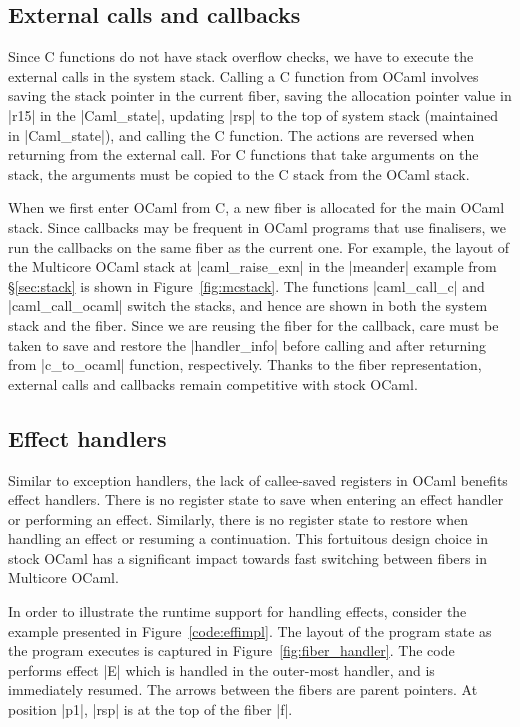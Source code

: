 \documentclass[sigplan,screen]{acmart}
\begin{document}
\subsection{External calls and callbacks}

Since C functions do not have stack overflow checks, we have to execute the
external calls in the system stack. Calling a C function from OCaml involves
saving the stack pointer in the current fiber, saving the allocation pointer
value in |r15| in the |Caml_state|, updating |rsp| to the top of system stack
(maintained in |Caml_state|), and calling the C function. The actions are
reversed when returning from the external call. For C functions that take
arguments on the stack, the arguments must be copied to the C stack from the
OCaml stack.

When we first enter OCaml from C, a new fiber is allocated for the main OCaml
stack. Since callbacks may be frequent in OCaml programs that use finalisers,
we run the callbacks on the same fiber as the current one. For example, the
layout of the Multicore OCaml stack at |caml_raise_exn| in the |meander|
example from \S\ref{sec:stack} is shown in Figure~\ref{fig:mcstack}. The
functions |caml_call_c| and |caml_call_ocaml| switch the stacks, and hence are
shown in both the system stack and the fiber. Since we are reusing the fiber
for the callback, care must be taken to save and restore the |handler_info|
before calling and after returning from |c_to_ocaml| function, respectively.
Thanks to the fiber representation, external calls and callbacks remain
competitive with stock OCaml.

\subsection{Effect handlers}
\label{sec:effimpl}

Similar to exception handlers, the lack of callee-saved registers in OCaml
benefits effect handlers. There is no register state to save when entering an
effect handler or performing an effect. Similarly, there is no register state
to restore when handling an effect or resuming a continuation. This fortuitous
design choice in stock OCaml has a significant impact towards fast switching
between fibers in Multicore OCaml.

In order to illustrate the runtime support for handling effects, consider the
example presented in Figure~\ref{code:effimpl}. The layout of the program state
as the program executes is captured in Figure~\ref{fig:fiber_handler}. The code
performs effect |E| which is handled in the outer-most handler, and is
immediately resumed. The arrows between the fibers are parent pointers. At
position |p1|, |rsp| is at the top of the fiber |f|.
\end{document}
